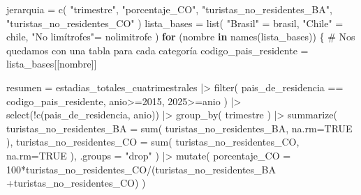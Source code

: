 \documentclass[
  spanish,
  letterpaper,
  DIV=11,
  numbers=noendperiod]{scrartcl}
\newenvironment{Shaded}{\begin{snugshade}}{\end{snugshade}}
\newcommand{\AttributeTok}[1]{\textcolor[rgb]{0.40,0.45,0.13}{#1}}
\newcommand{\CommentTok}[1]{\textcolor[rgb]{0.37,0.37,0.37}{#1}}
\newcommand{\ConstantTok}[1]{\textcolor[rgb]{0.56,0.35,0.01}{#1}}
\newcommand{\ControlFlowTok}[1]{\textcolor[rgb]{0.00,0.23,0.31}{\textbf{#1}}}
\newcommand{\DecValTok}[1]{\textcolor[rgb]{0.68,0.00,0.00}{#1}}
\newcommand{\FunctionTok}[1]{\textcolor[rgb]{0.28,0.35,0.67}{#1}}
\newcommand{\NormalTok}[1]{\textcolor[rgb]{0.00,0.23,0.31}{#1}}
\newcommand{\OtherTok}[1]{\textcolor[rgb]{0.00,0.23,0.31}{#1}}
\newcommand{\SpecialCharTok}[1]{\textcolor[rgb]{0.37,0.37,0.37}{#1}}
\newcommand{\StringTok}[1]{\textcolor[rgb]{0.13,0.47,0.30}{#1}}
\begin{document}
\begin{Shaded}
\begin{Highlighting}[]
\NormalTok{jerarquia }\OtherTok{=} \FunctionTok{c}\NormalTok{(}
  \StringTok{"trimestre"}\NormalTok{, }
  \StringTok{"porcentaje\_CO"}\NormalTok{,}
  \StringTok{"turistas\_no\_residentes\_BA"}\NormalTok{, }
  \StringTok{"turistas\_no\_residentes\_CO"}
\NormalTok{)}
\NormalTok{lista\_bases }\OtherTok{=} \FunctionTok{list}\NormalTok{(}
  \StringTok{"Brasil"} \OtherTok{=} \StringTok{\textquotesingle{}brasil\textquotesingle{}}\NormalTok{, }
  \StringTok{"Chile"} \OtherTok{=} \StringTok{\textquotesingle{}chile\textquotesingle{}}\NormalTok{, }
  \StringTok{"No limítrofes"}\OtherTok{=} \StringTok{\textquotesingle{}nolimitrofe\textquotesingle{}}
\NormalTok{ )}
\ControlFlowTok{for}\NormalTok{ (nombre }\ControlFlowTok{in} \FunctionTok{names}\NormalTok{(lista\_bases)) \{}
  \CommentTok{\# Nos quedamos con una tabla para cada categoría}
\NormalTok{  codigo\_pais\_residente }\OtherTok{=}\NormalTok{ lista\_bases[[nombre]]}
  
\NormalTok{  resumen }\OtherTok{=}\NormalTok{ estadias\_totales\_cuatrimestrales }\SpecialCharTok{|\textgreater{}} 
    \FunctionTok{filter}\NormalTok{(}
\NormalTok{      pais\_de\_residencia }\SpecialCharTok{==}\NormalTok{ codigo\_pais\_residente,}
\NormalTok{      anio}\SpecialCharTok{\textgreater{}=}\DecValTok{2015}\NormalTok{,}
      \DecValTok{2025}\SpecialCharTok{\textgreater{}=}\NormalTok{anio}
\NormalTok{    ) }\SpecialCharTok{|\textgreater{}} 
    \FunctionTok{select}\NormalTok{(}\SpecialCharTok{!}\FunctionTok{c}\NormalTok{(pais\_de\_residencia, anio)) }\SpecialCharTok{|\textgreater{}} 
    \FunctionTok{group\_by}\NormalTok{(}
\NormalTok{      trimestre}
\NormalTok{    ) }\SpecialCharTok{|\textgreater{}} 
    \FunctionTok{summarize}\NormalTok{(}
      \AttributeTok{turistas\_no\_residentes\_BA =} \FunctionTok{sum}\NormalTok{(}
\NormalTok{        turistas\_no\_residentes\_BA, }\AttributeTok{na.rm=}\ConstantTok{TRUE}
\NormalTok{      ),}
      \AttributeTok{turistas\_no\_residentes\_CO =} \FunctionTok{sum}\NormalTok{(}
\NormalTok{        turistas\_no\_residentes\_CO, }\AttributeTok{na.rm=}\ConstantTok{TRUE}
\NormalTok{      ),}
      \AttributeTok{.groups =} \StringTok{"drop"}
\NormalTok{    ) }\SpecialCharTok{|\textgreater{}} 
    \FunctionTok{mutate}\NormalTok{(}
      \AttributeTok{porcentaje\_CO =} \DecValTok{100}\SpecialCharTok{*}\NormalTok{turistas\_no\_residentes\_CO}\SpecialCharTok{/}\NormalTok{(turistas\_no\_residentes\_BA }\SpecialCharTok{+}\NormalTok{turistas\_no\_residentes\_CO)}
\NormalTok{    )}
  

\end{Highlighting}
\end{Shaded}
\end{document}
